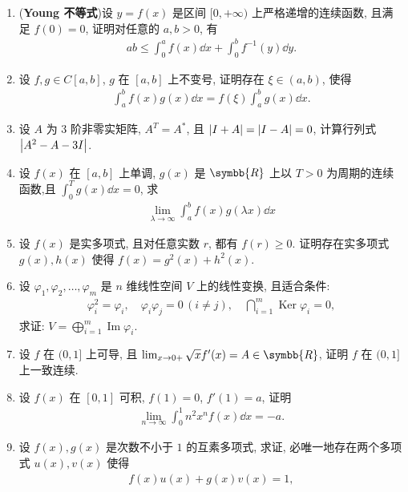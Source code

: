 \documentclass{ctexart}
\let\emph\textbf
\let\ge\geqslant
\let\le\leqslant
\newcommand{\limit}[2]{\lim_{#1 \to #2}}
\newcommand{\R}{\ensuremath{\symbb{R}}}
\DeclareMathOperator{\Image}{Im}
\DeclareMathOperator{\Ker}{Ker}
\begin{document}
\begin{enumerate}[series=exer]
    \item (\emph{Young 不等式})设 $ y=f(x) $ 是区间 $ [0, +\infty) $ 上严格递增的连续函数, 且满足 $ f(0) = 0 $, 证明对任意的 $ a, b > 0 $, 有
    \begin{align*}
        ab \le \int_{0}^{a}f(x) \dd{x} + \int_{0}^{b} f^{-1}(y) \dd{y}.
    \end{align*}
    \item 设 $ f, g \in C[a, b] $, $ g $ 在 $ [a, b] $ 上不变号, 证明存在 $ \xi\in (a, b) $, 使得
    \begin{align*}
        \int_{a}^{b} f(x)g(x) \dd{x} = f(\xi)\int_{a}^{b} g(x) \dd{x}.
    \end{align*}   
    \item 设 $ A $ 为 $ 3 $ 阶非零实矩阵, $ A^{T} = A^{*} $, 且 $ \abs{I + A} = \abs{I - A} = 0 $, 计算行列式 $ \abs{A^{2} - A - 3I} $.
    \item 设 $ f(x) $ 在 $ [a, b] $ 上单调, $ g(x) $ 是 $ \R $ 上以 $ T>0 $ 为周期的连续函数,且 $ \int_{0}^{T} g(x) \dd{x} = 0 $, 求
    \begin{align*}
        \limit{\lambda}{\infty} \int_{a}^{b} f(x)g(\lambda x) \dd{x}
    \end{align*}
    \item 设 $ f(x) $ 是实多项式, 且对任意实数 $ r $, 都有 $ f(r) \ge 0 $. 证明存在实多项式 $ g(x), h(x) $ 使得 $ f(x) = g^{2}(x) + h^{2}(x) $.   
    \item 设 $ \varphi_{1}, \varphi_{2}, \dots, \varphi_{m} $ 是 $ n $ 维线性空间 $ V $ 上的线性变换, 且适合条件:
    \begin{align*}
        \varphi_{i}^{2} = \varphi_{i}, \quad \varphi_{i}\varphi_{j} = 0\,(i\ne j), \quad \bigcap_{i=1}^{m}\Ker\varphi_{i} = 0,
    \end{align*}
    求证: $ V = \bigoplus_{i=1}^{m}\Image\varphi_{i} $. 
    \item 设 $ f $ 在 $ (0, 1] $ 上可导, 且 $ \limit{x}{0+} \sqrt{x} f'(x) = A \in \R $, 证明 $ f $ 在 $ (0, 1] $ 上一致连续. 
    \item 设 $ f(x) $ 在 $ [0, 1] $ 可积, $ f(1) = 0 $, $ f'(1) = a $, 证明
    \begin{align*}
        \limit{n}{\infty}\int_{0}^{1}n^{2}x^{n}f(x)\dd{x} = -a.
    \end{align*}
    \item 设 $ f(x), g(x) $ 是次数不小于 $ 1 $ 的互素多项式, 求证, 必唯一地存在两个多项式 $ u(x), v(x) $ 使得
    \begin{align*}
        f(x)u(x) + g(x)v(x) = 1,
    \end{align*}

\end{enumerate}
\end{document}
